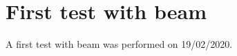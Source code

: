 \documentclass[a4paper, 11 pt]{report}
\newcommand{\Vind}{$\Delta V_{ind}$}
\newcommand{\Vthgem}{$\Delta V_{TH}$}
\newcommand{\Vdrift}{$ \Delta V_{drift}$}
\begin{document}
%
%
%



\clearpage


\section{First test with beam} \label{sec:test_beam}

A first test with beam was performed on 19/02/2020. 
\end{document}

